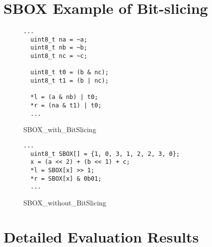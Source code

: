 \clearpage
\section{SBOX Example of Bit-slicing}
\label{appendix:SBOX}

\begin{figure}[h!]
      \centering
      \begin{lstlisting}[xleftmargin=.02\textwidth,xrightmargin=.01\textwidth]
  ...
  uint8_t na = ~a;
  uint8_t nb = ~b;
  uint8_t nc = ~c;
  
  uint8_t t0 = (b & nc);
  uint8_t t1 = (b | nc);
  
  *l = (a & nb) | t0;
  *r = (na & t1) | t0;
  ...
  \end{lstlisting}
      \caption{SBOX\_with\_BitSlicing}
      \label{SBOX_bitslicing}
  \end{figure}
  
  \begin{figure}[h!]
      \centering
      \begin{lstlisting}[xleftmargin=.02\textwidth,xrightmargin=.01\textwidth]
  ...
  uint8_t SBOX[] = {1, 0, 3, 1, 2, 2, 3, 0};
  x = (a << 2) + (b << 1) + c;
  *l = SBOX[x] >> 1;
  *r = SBOX[x] & 0b01;
  ...
  \end{lstlisting}
      \caption{SBOX\_without\_BitSlicing}
      \label{SBOX_da}
  \end{figure}

\section{Detailed Evaluation Results}
\label{sec:result-table}
























